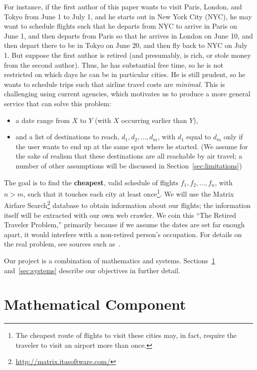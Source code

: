 \documentclass{article}
\begin{document}
For instance, if the first author of this paper wants to visit Paris, London, and Tokyo from June 1 to July 1, and he starts out in New York City
(NYC), he may want to schedule flights such that he departs from NYC to arrive in Paris on June 1, and then departs from Paris so that he arrives in
London on June 10, and then depart there to be in Tokyo on June 20, and then fly back to NYC on July 1. But suppose the first author is retired (and
presumably, is rich, or stole money from the second author). Thus, he has substantial free time, so he is not restricted on which days he can be in
particular cities. He is still prudent, so he wants to schedule trips such that airline travel costs are \emph{minimal}. This is challenging using
current agencies, which motivates us to produce a more general service that can solve this problem:

\begin{itemize}
    \item a date range from $X$ to $Y$ (with $X$ occurring earlier than $Y$),
    \item and a list of destinations to reach, $d_1, d_2, \ldots, d_m$, with $d_1$ equal to $d_m$ only if the user wants to end up at the same spot
where he started. (We assume for the sake of realism that these destinations are all reachable by air travel; a number of other assumptions will be
discussed in Section~\ref{sec:limitations})
\end{itemize}

The goal is to find the \textbf{cheapest}, valid schedule of flights $f_1, f_2, \ldots, f_n$, with $n > m$, such that it touches each city at least
once\footnote{The cheapest route of flights to visit these cities may, in fact, require the traveler to visit an airport more than once.}. We will use
the Matrix Airfare Search\footnote{\url{http://matrix.itasoftware.com/}} database to obtain information about our flights; the information itself will
be extracted with our own web crawler. We coin this ``The Retired Traveler Problem,'' primarily because if we assume the dates are set far enough
apart, it would interfere with a non-retired person's occupation. For details on the real problem, see sources such as~\cite{Applegate:2007:TSP:1374811}.

Our project is a combination of mathematics and systems. Sections~\ref{sec:math} and~\ref{sec:systems} describe our objectives in further detail.

\section{Mathematical Component}\label{sec:math}
\end{document}
